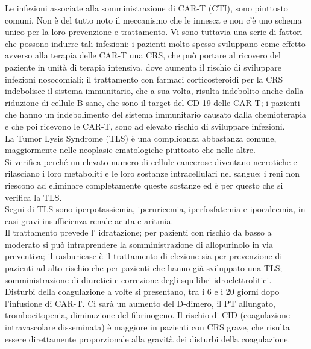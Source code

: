 Le infezioni associate alla somministrazione di CAR-T (CTI), sono piuttosto comuni. Non è del tutto noto il meccanismo 
che le innesca e non c’è uno schema unico per la loro prevenzione e trattamento. Vi sono tuttavia una serie di fattori 
che possono indurre tali infezioni: i pazienti molto spesso sviluppano come effetto avverso alla terapia delle CAR-T 
una CRS, che può portare al ricovero del paziente in unità di terapia intensiva, dove aumenta il rischio di sviluppare 
infezioni nosocomiali; il trattamento con farmaci corticosteroidi per la CRS indebolisce il sistema immunitario, che a  
sua volta, risulta indebolito anche dalla riduzione di cellule B sane, che sono il target del CD-19 delle CAR-T; 
i pazienti che hanno un indebolimento del sistema immunitario causato dalla chemioterapia e che poi ricevono le CAR-T, 
sono ad elevato rischio di sviluppare infezioni\cite{Frontiers}.\\

La Tumor Lysis Syndrome (TLS) è una complicanza abbastanza comune, maggiormente nelle neoplasie ematologiche piuttosto 
che nelle altre.\\ 
Si verifica perché un elevato numero di cellule cancerose diventano necrotiche e rilasciano i loro metaboliti e le 
loro sostanze intracellulari nel sangue; i reni non riescono ad eliminare completamente queste sostanze ed è per 
questo che si verifica la TLS.\\ 
Segni di TLS sono iperpotassiemia, iperuricemia, iperfosfatemia e ipocalcemia, in casi gravi insufficienza renale 
acuta e aritmia.\\ 
Il trattamento prevede l’ idratazione; per pazienti con rischio da basso a moderato si può intraprendere la 
somministrazione di allopurinolo in via preventiva; il rasburicase è il trattamento di elezione sia per prevenzione 
di pazienti ad alto rischio che per pazienti che hanno già sviluppato una TLS; somministrazione di diuretici e 
correzione degli squilibri idroelettrolitici\cite{Frontiers}.\\

Disturbi della coagulazione a volte si presentano, tra i 6 e i 20 giorni dopo l’infusione di CAR-T. Ci sarà un  
aumento del D-dimero, il PT allungato, trombocitopenia, diminuzione del fibrinogeno. Il rischio di CID 
(coagulazione intravascolare disseminata) è maggiore in pazienti con CRS grave, 
che risulta essere direttamente proporzionale alla gravità dei disturbi della coagulazione\cite{Frontiers}.\\

